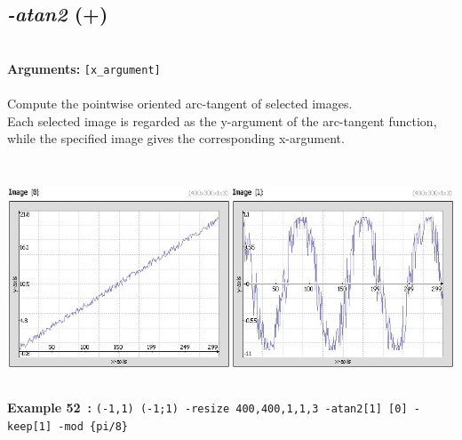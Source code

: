 \documentclass[a4paper,11pt,twoside]{book}
\begin{document}
\subsection{\emph{-atan2} (+)}\vspace*{-0.5em}
~\\\textbf{Arguments: } 
{\small \texttt{[x\_argument]}}\\~\\
Compute the pointwise oriented arc-tangent of selected images.
~\\Each selected image is regarded as the y-argument of the arc-tangent function, while the
specified image gives the corresponding x-argument.
\begin{center}\includegraphics[keepaspectratio=true,height=7cm,width=\textwidth]{img/gmic_def52.jpg}\\
{\footnotesize \textbf{Example 52~:} \texttt{(-1,1) (-1;1) -resize 400,400,1,1,3 -atan2[1] [0] -keep[1] -mod \{pi/8\}}}
\end{center}
\end{document}
